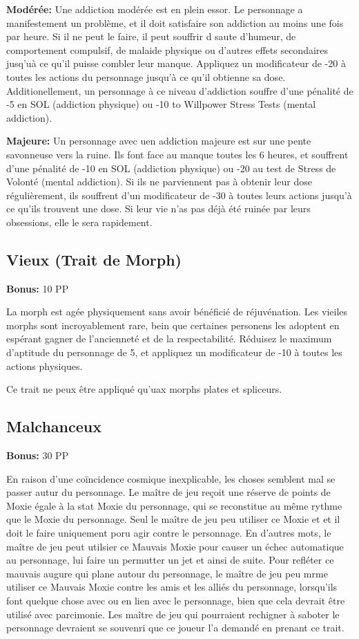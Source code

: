\textbf{Modérée:} Une addiction modérée est en plein essor. Le personnage a manifestement un problème, et il doit satisfaire son addiction au moins une fois par heure. Si il ne peut le faire, il peut souffrir d saute d'humeur, de comportement compulsif, de malaide physique ou d'autres effets secondaires jusq'uà ce qu'il puisse combler leur manque. Appliquez un modificateur de -20 à toutes les actions du personnage jusqu'à ce qu'il obtienne sa dose. Additionellement, un personnage à ce niveau d'addiction souffre d'une pénalité de -5 en SOL (addiction physique) ou -10 to Willpower Stress Tests (mental addiction). 

\textbf{Majeure:} Un personnage avec uen addiction majeure est sur une pente savonneuse vers la ruine. Ils font face au manque toutes les 6 heures, et souffrent d'une pénalité de -10 en SOL (addiction physique) ou -20 au test de Stress de Volonté (mental addiction). Si ils ne parviennent pas à obtenir leur dose régulièrement, ils souffrent d'un modificateur de -30 à toutes leurs actions jusqu'à ce qu'ils trouvent une dose. Si leur vie n'as pas déjà été ruinée par leurs obsessions, elle le sera rapidement. 

\subsection{Vieux (Trait de Morph)} \textbf{Bonus:} 10 PP 

La morph est agée physiquement sans avoir bénéficié de réjuvénation. Les vieiles morphs sont incroyablement rare, bein que certaines personens les adoptent en espérant gagner de l'ancienneté et de la respectabilité. Réduisez le maximum d'aptitude du personnage de 5, et appliquez un modificateur de -10 à toutes les actions physiques. 

Ce trait ne peux être appliqué qu'uax morphs plates et spliceurs. 

\subsection{Malchanceux} \label{sec:traits-bad-luck} 

\textbf{Bonus:} 30 PP 

En raison d'une coïncidence cosmique inexplicable, les choses semblent mal se passer autur du personnage. Le maître de jeu reçoit une réserve de points de Moxie égale à la stat Moxie du personnage, qui se reconstitue au même rythme que le Moxie du personnage. Seul le maître de jeu peu utiliser ce Moxie et et il doit le faire uniquement poru agir contre le personnage. En d'autres mots, le maître de jeu peut utilsier ce Mauvais Moxie pour causer un échec automatique au personnage, lui faire un permutter un jet et ainsi de suite. Pour refléter ce mauvais augure qui plane autour du personnage, le maître de jeu peu mrme utiliser ce Mauvais Moxie contre les amis et les alliés du personnage, lorsqu'ils font quelque chose avec ou en lien avec le personnage, bien que cela devrait être utilisé avec parcimonie. Les maître de jeu qui pourraient rechigner à saboter le personnage devraient se souvenri que ce joueur l'a demandé en prenant ce trait. 

